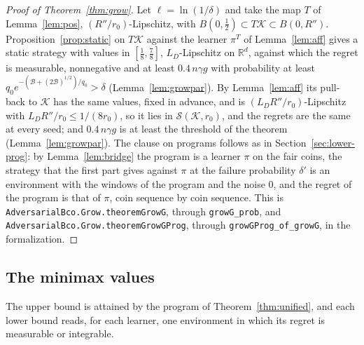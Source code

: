 \documentclass[11pt]{amsart}
\theoremstyle{definition}
\numberwithin{equation}{section}
\newcommand{\R}{\mathbb{R}}
\newcommand{\cK}{\mathcal{K}}
\begin{document}
\begin{proof}[Proof of Theorem~\ref{thm:grow}]
Let $\ell=\ln(1/\delta)$ and take the map $T$ of Lemma~\ref{lem:pos}, $(R''/r_0)$-Lipschitz, with $B(0,\frac12)\subset T\cK\subset B(0,R'')$. Proposition~\ref{prop:static} on $T\cK$ against the learner $\pi^T$ of Lemma~\ref{lem:aff} gives a static strategy with values in $[\frac18,\frac78]$, $L_D$-Lipschitz on $\R^d$, against which the regret is measurable, nonnegative and at least $0.4\,n\gamma g$ with probability at least $q_0e^{-(\mathcal B+(2\mathcal B)^{1/2})/q_0}>\delta$ (Lemma~\ref{lem:growpar}). By Lemma~\ref{lem:aff} its pull-back to $\cK$ has the same values, fixed in advance, and is $(L_DR''/r_0)$-Lipschitz with $L_DR''/r_0\le1/(8r_0)$, so it lies in $\mathcal S(\cK,r_0)$, and the regrets are the same at every seed; and $0.4\,n\gamma g$ is at least the threshold of the theorem (Lemma~\ref{lem:growpar}). The clause on programs follows as in Section~\ref{sec:lower-prog}: by Lemma~\ref{lem:bridge} the program is a learner $\pi$ on the fair coins, the strategy that the first part gives against $\pi$ at the failure probability $\delta'$ is an environment with the windows of the program and the noise $0$, and the regret of the program is that of $\pi$, coin sequence by coin sequence.
This is \texttt{AdversarialBco.Grow.theoremGrowG}, through \texttt{growG\_prob}, and \texttt{AdversarialBco.Grow.theoremGrowGProg}, through \texttt{growGProg\_of\_growG}, in the formalization.
\end{proof}

\subsection{The minimax values}\label{sec:lower-mm}

The upper bound is attained by the program of Theorem~\ref{thm:unified}, and each lower bound reads, for each learner, one environment in which its regret is measurable or integrable.
\end{document}
